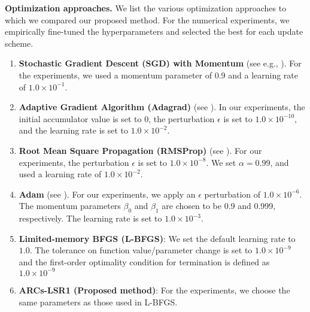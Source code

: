 
\noindent \textbf{Optimization approaches.} 
We list the various optimization approaches to which we compared our proposed method.  For the numerical experiments, we empirically fine-tuned the hyperparameters and selected the best for each update scheme.




\begin{enumerate}

\item \textbf{Stochastic Gradient Descent (SGD) with Momentum}  (see e.g., \citet{Qia99}).
For the experiments, we used a momentum parameter of $0.9$ and a learning rate of $1.0 \times 10^{-1}$.

\item 
\textbf{Adaptive Gradient Algorithm (Adagrad)} 
(see \citet{duchi2011adaptive}).  
In our experiments, the initial accumulator value is set to 0, the perturbation $\epsilon$ is set to $1.0 \times 10^{-10}$, and the learning rate is set to $1.0 \times 10^{-2}$.


\item \textbf{Root Mean Square Propagation (RMSProp)} 
(see \citet{hinton2012neural}).  For our experiments, the perturbation $\epsilon$ is set  to $1.0 \times 10^{-8}$. We set $\alpha = 0.99$, and used a learning rate of $1.0 \times 10^{-2}$.

\item \textbf{Adam} 
(see \citet{kingma2014adam}). For  our experiments, we apply an $\epsilon$ perturbation of $1.0 \times 10^{-6}$. The momentum parameters $\beta_0$ and $\beta_1$ are chosen to be 0.9 and 0.999, respectively.  The learning rate is set to $1.0 \times 10^{-3}$. 


\item \textbf{Limited-memory BFGS (L-BFGS)}: We set the default learning rate to $1.0$. The tolerance on function value/parameter change is set to $1.0 \times 10^{-9}$ and the first-order optimality condition for termination is defined as $1.0 \times 10^{-9}$

\item  \textbf{ARCs-LSR1 (Proposed method)}: For the experiments, we choose the same parameters as those used in L-BFGS. %
\end{enumerate}

